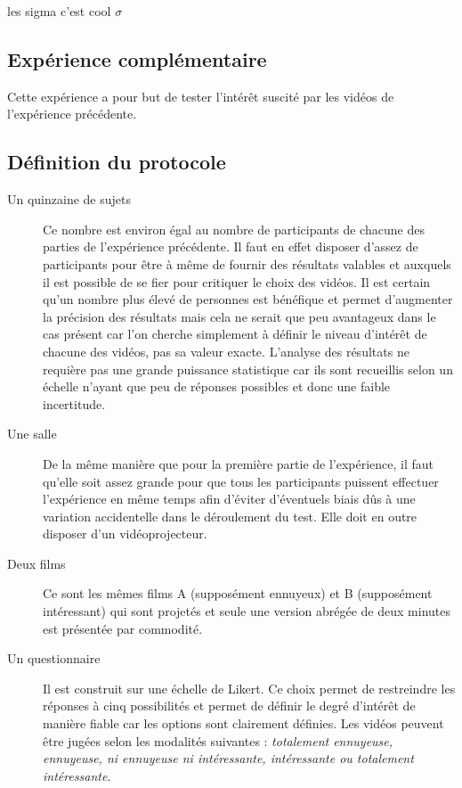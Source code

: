\documentclass[12pt,fleqn,oneside,openany]{book} %
\begin{document}
les sigma c'est cool $\sigma$
\clearpage

\subsection{Expérience complémentaire} \label{ssec:exp1.2}
Cette expérience a pour but de tester l'intérêt suscité par les vidéos de l'expérience précédente. 

\subsection{Définition du protocole} \label{ssec:defProto1.2}
\begin{description}
	\item[Un quinzaine de sujets] Ce nombre est environ égal au nombre de participants de chacune des parties de l'expérience précédente. Il faut en effet disposer d'assez de participants pour être à même de fournir des résultats valables et auxquels il est possible de se fier pour critiquer le choix des vidéos. Il est certain qu'un nombre plus élevé de personnes est bénéfique et permet d'augmenter la précision des résultats mais cela ne serait que peu avantageux dans le cas présent car l'on cherche simplement à définir le niveau d'intérêt de chacune des vidéos, pas sa valeur exacte. L'analyse des résultats ne requière pas une grande puissance statistique car ils sont recueillis selon un échelle n'ayant que peu de réponses possibles et donc une faible incertitude.
	\item[Une salle] De la même manière que pour la première partie de l'expérience, il faut qu'elle soit assez grande pour que tous les participants puissent effectuer l'expérience en même temps afin d'éviter d'éventuels biais dûs à une variation accidentelle dans le déroulement du test. Elle doit en outre disposer d'un vidéoprojecteur.
	\item[Deux films] Ce sont les mêmes films A (supposément ennuyeux) et B (supposément intéressant) qui sont projetés et seule une version abrégée de deux minutes est présentée par commodité.
	\item[Un questionnaire] Il est construit sur une échelle de Likert. Ce choix permet de restreindre les réponses à cinq possibilités et permet de définir le degré d'intérêt de manière fiable car les options sont clairement définies. Les vidéos peuvent être jugées selon les modalités suivantes : \emph{totalement ennuyeuse, ennuyeuse, ni ennuyeuse ni intéressante, intéressante ou totalement intéressante}.
\end{description}
\end{document}
